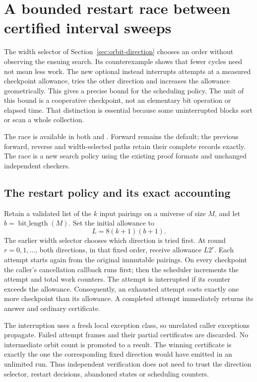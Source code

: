 \section{A bounded restart race between certified interval sweeps}
\label{sec:orbit-race}

The width selector of Section~\ref{sec:orbit-direction} chooses an order
without observing the ensuing search. Its counterexample shows that
fewer cycles need not mean less work. The new optional
 instead interrupts attempts at a measured
checkpoint allowance, tries the other direction and increases the allowance
geometrically. This gives a precise bound for the scheduling policy.
The unit of this bound is a cooperative checkpoint, not an elementary
bit operation or elapsed time. That distinction is essential because some
uninterrupted blocks sort or scan a whole collection.

The race is available in both  and
. Forward remains the default; the
previous forward, reverse and width-selected paths retain their complete
records exactly. The race is a new search policy using the existing proof
formats and unchanged independent checkers.

\subsection{The restart policy and its exact accounting}

Retain a validated list of the $k$ input pairings on a universe of size
$M$, and let $b=\operatorname{bit\_length}(M)$. Set the initial allowance to
\[
 L=8(k+1)(b+1).
\]
The earlier width selector chooses which direction is tried first. At
round $r=0,1,\ldots$, both directions, in that fixed order, receive allowance
$L2^r$. Each attempt starts again from the original immutable pairings.
On every checkpoint the caller's cancellation callback runs first; then
the scheduler increments the attempt and total work counters. The attempt
is interrupted if its counter exceeds the allowance. Consequently, an
exhausted attempt costs exactly one more checkpoint than its allowance.
A completed attempt immediately returns its answer and ordinary certificate.

The interruption uses a fresh local exception class, so unrelated caller
exceptions propagate. Failed attempt frames and their partial certificates
are discarded. No intermediate orbit count is promoted to a result. The
winning certificate is exactly the one the corresponding fixed direction
would have emitted in an unlimited run. Thus independent verification
does not need to trust the direction selector, restart decisions, abandoned
states or scheduling counters.

